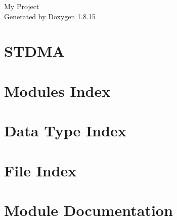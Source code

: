 \let\mypdfximage\pdfximage\def\pdfximage{\immediate\mypdfximage}\documentclass[twoside]{book}
\newcommand{\+}{\discretionary{\mbox{\scriptsize$\hookleftarrow$}}{}{}}
\newcommand{\clearemptydoublepage}{%
  \newpage{\pagestyle{empty}\cleardoublepage}%
}
\begin{document}
\hypersetup{pageanchor=false,
             bookmarksnumbered=true,
             pdfencoding=unicode
            }
\begin{titlepage}
\vspace*{7cm}
\begin{center}%
{\Large My Project }\\
\vspace*{1cm}
{\large Generated by Doxygen 1.8.15}\\
\end{center}
\end{titlepage}
\clearemptydoublepage
{}
\tableofcontents
\clearemptydoublepage
{}
\hypersetup{pageanchor=true}

\chapter{S\+T\+D\+MA}
\label{md___users_jihoon__documents_develop__s_t_d_m_a__r_e_a_d_m_e}

\chapter{Modules Index}

\chapter{Data Type Index}

\chapter{File Index}

\chapter{Module Documentation}












\end{document}

